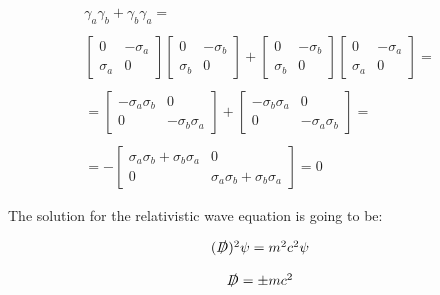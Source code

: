 \begin{equation}
  \begin{array}{c}
    \gamma_a\gamma_b + \gamma_b\gamma_a =
    \\

    \\
    \begin{bmatrix}
      0 & -\sigma_a\\
      \sigma_a & 0
    \end{bmatrix}\begin{bmatrix}
      0 & -\sigma_b\\
      \sigma_b & 0
    \end{bmatrix} + \begin{bmatrix}
      0 & -\sigma_b\\
      \sigma_b & 0
    \end{bmatrix}
    \begin{bmatrix}
      0 & -\sigma_a\\
      \sigma_a & 0
    \end{bmatrix} =
    \\

    \\
    = \begin{bmatrix}
      -\sigma_a\sigma_b & 0\\
      0 & -\sigma_b\sigma_a
    \end{bmatrix}+ \begin{bmatrix}
      -\sigma_b\sigma_a & 0\\
      0 & -\sigma_a\sigma_b
    \end{bmatrix} =
    \\

    \\
    = -\begin{bmatrix}
      \sigma_a\sigma_b + \sigma_b\sigma_a& 0\\
      0 & \sigma_a\sigma_b + \sigma_b\sigma_a
    \end{bmatrix} = 0
  \end{array}
\end{equation}

The solution for the relativistic wave equation is going to be:

\begin{equation}
  \begin{array}{c}
    (\slashed{D})^2 \psi = m^2c^2\psi
    \\

    \\
    \slashed{D} = \pm m c^2
  \end{array}
\end{equation}

